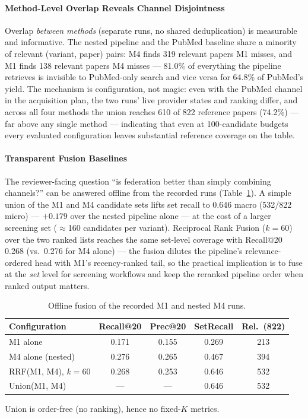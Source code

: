 \documentclass[nonacm,sigconf]{acmart}
\begin{document}
\paragraph{Method-Level Overlap Reveals Channel Disjointness}
Overlap \emph{between methods} (separate runs, no shared deduplication) is
measurable and informative. The nested pipeline and the PubMed baseline
share a minority of relevant (variant, paper) pairs: M4 finds 319 relevant
papers M1 misses, and M1 finds 138 relevant papers M4 misses --- 81.0\% of
everything the pipeline retrieves is invisible to PubMed-only search and
vice versa for 64.8\% of PubMed's yield. The mechanism is configuration,
not magic: even with the PubMed channel in the acquisition plan, the two
runs' live provider states and ranking differ, and across all four methods
the union reaches 610 of 822 reference papers (74.2\%) --- far above any
single method --- indicating that even at 100-candidate budgets every
evaluated configuration leaves substantial reference coverage on the
table.

\paragraph{Transparent Fusion Baselines}
The reviewer-facing question ``is federation better than simply combining
channels?'' can be answered offline from the recorded runs
(Table~\ref{tab:fusion}). A simple union of the M1 and M4 candidate sets
lifts set recall to 0.646 macro (532/822 micro) --- $+0.179$ over the
nested pipeline alone --- at the cost of a larger screening set
($\approx$160 candidates per variant). Reciprocal Rank Fusion
\cite{cormack2009reciprocal} ($k{=}60$) over the two ranked lists reaches
the same set-level coverage with Recall@20 0.268 (vs.\ 0.276 for M4
alone) --- the fusion dilutes the pipeline's relevance-ordered head with
M1's recency-ranked tail, so the practical implication is to fuse at the
\emph{set} level for screening workflows and keep the reranked pipeline
order when ranked output matters.

\begin{table}[t]
\centering
\small
\setlength{\tabcolsep}{4pt}
\begin{threeparttable}
\caption{Offline fusion of the recorded M1 and nested M4 runs.}
\label{tab:fusion}
\begin{tabular}{@{}lcccc@{}}
\toprule
Configuration & Recall@20 & Prec@20 & SetRecall & Rel.\ (822) \\
\midrule
M1 alone & 0.171 & 0.155 & 0.269 & 213 \\
M4 alone (nested) & 0.276 & 0.265 & 0.467 & 394 \\
RRF(M1, M4), $k{=}60$ & 0.268 & 0.253 & 0.646 & 532 \\
Union(M1, M4) & --- & --- & 0.646 & 532 \\
\bottomrule
\end{tabular}
\begin{tablenotes}
\item Union is order-free (no ranking), hence no fixed-$K$ metrics.
\end{tablenotes}
\end{threeparttable}
\end{table}
\end{document}
